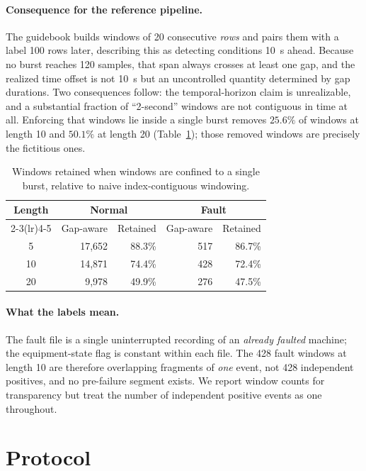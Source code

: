 \documentclass{article}
\begin{document}
\paragraph{Consequence for the reference pipeline.} The guidebook builds
windows of 20 consecutive \emph{rows} and pairs them with a label 100 rows
later, describing this as detecting conditions \SI{10}{\second} ahead. Because
no burst reaches 120 samples, that span always crosses at least one gap, and
the realized time offset is not \SI{10}{\second} but an uncontrolled quantity
determined by gap durations. Two consequences follow: the temporal-horizon
claim is unrealizable, and a substantial fraction of ``2-second'' windows are
not contiguous in time at all. Enforcing that windows lie inside a single
burst removes $25.6\%$ of windows at length 10 and $50.1\%$ at length 20
(Table~\ref{tab:e1}); those removed windows are precisely the fictitious ones.

\begin{table}[t]
\caption{Windows retained when windows are confined to a single burst,
relative to naive index-contiguous windowing.}
\label{tab:e1}
\vskip 0.08in
\centering
\small
\begin{tabular}{crrrr}
\toprule
\multirow{2}{*}{Length} & \multicolumn{2}{c}{Normal} & \multicolumn{2}{c}{Fault} \\
\cmidrule(lr){2-3}\cmidrule(lr){4-5}
 & Gap-aware & Retained & Gap-aware & Retained \\
\midrule
5  & 17{,}652 & 88.3\% & 517 & 86.7\% \\
10 & 14{,}871 & 74.4\% & 428 & 72.4\% \\
20 & \phantom{0}9{,}978 & 49.9\% & 276 & 47.5\% \\
\bottomrule
\end{tabular}
\end{table}

\paragraph{What the labels mean.} The fault file is a single uninterrupted
recording of an \emph{already faulted} machine; the equipment-state flag is
constant within each file. The 428 fault windows at length 10 are therefore
overlapping fragments of \emph{one} event, not 428 independent positives, and
no pre-failure segment exists. We report window counts for transparency but
treat the number of independent positive events as one throughout.

\section{Protocol}
\label{sec:protocol}
\end{document}
